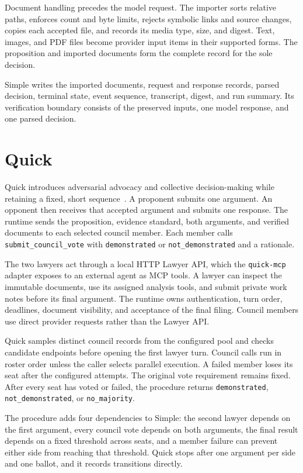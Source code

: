 \documentclass[11pt]{article}
\newcommand{\code}[1]{\texttt{#1}}
\begin{document}
Document handling precedes the model request.  The importer sorts relative paths, enforces count and byte limits, rejects symbolic links and source changes, copies each accepted file, and records its media type, size, and digest.  Text, images, and PDF files become provider input items in their supported forms.  The proposition and imported documents form the complete record for the sole decision.

Simple writes the imported documents, request and response records, parsed decision, terminal state, event sequence, transcript, digest, and run summary.  Its verification boundary consists of the preserved inputs, one model response, and one parsed decision.

\section{Quick}

Quick introduces adversarial advocacy and collective decision-making while retaining a fixed, short sequence~\cite{manuals}.  A proponent submits one argument.  An opponent then receives that accepted argument and submits one response.  The runtime sends the proposition, evidence standard, both arguments, and verified documents to each selected council member.  Each member calls \code{submit\_council\_vote} with \code{demonstrated} or \code{not\_demonstrated} and a rationale.

The two lawyers act through a local HTTP Lawyer API, which the \code{quick-mcp} adapter exposes to an external agent as MCP tools.  A lawyer can inspect the immutable documents, use its assigned analysis tools, and submit private work notes before its final argument.  The runtime owns authentication, turn order, deadlines, document visibility, and acceptance of the final filing.  Council members use direct provider requests rather than the Lawyer API.

Quick samples distinct council records from the configured pool and checks candidate endpoints before opening the first lawyer turn.  Council calls run in roster order unless the caller selects parallel execution.  A failed member loses its seat after the configured attempts.  The original vote requirement remains fixed.  After every seat has voted or failed, the procedure returns \code{demonstrated}, \code{not\_demonstrated}, or \code{no\_majority}.

The procedure adds four dependencies to Simple: the second lawyer depends on the first argument, every council vote depends on both arguments, the final result depends on a fixed threshold across seats, and a member failure can prevent either side from reaching that threshold.  Quick stops after one argument per side and one ballot, and it records transitions directly.
\end{document}

